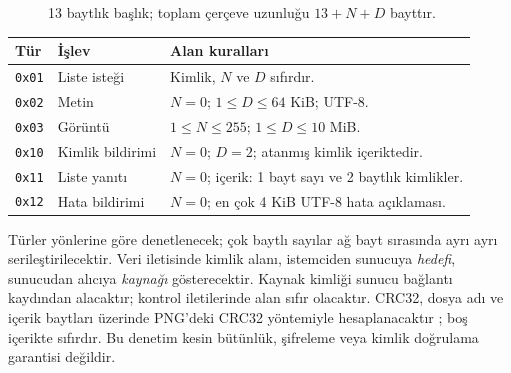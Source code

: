 \documentclass[12pt,oneside,a4paper]{article}
\begin{document}
\begin{figure}[H]
\centering
{}
\caption{13 baytlık başlık; toplam çerçeve uzunluğu $13+N+D$ bayttır.}
\label{fig:frame}
\end{figure}

\begingroup\small
\renewcommand{\arraystretch}{1.03}
\begin{tabularx}{\linewidth}{@{}l>{\raggedright\arraybackslash}p{3.0cm}>{\raggedright\arraybackslash}X@{}}
\toprule
\textbf{Tür} & \textbf{İşlev} & \textbf{Alan kuralları}\\
\midrule
\texttt{0x01} & Liste isteği & Kimlik, $N$ ve $D$ sıfırdır.\\
\texttt{0x02} & Metin & $N=0$; $1\leq D\leq64$ KiB; UTF-8.\\
\texttt{0x03} & Görüntü & $1\leq N\leq255$; $1\leq D\leq10$ MiB.\\
\texttt{0x10} & Kimlik bildirimi & $N=0$; $D=2$; atanmış kimlik içeriktedir.\\
\texttt{0x11} & Liste yanıtı & $N=0$; içerik: 1 bayt sayı ve 2 baytlık kimlikler.\\
\texttt{0x12} & Hata bildirimi & $N=0$; en çok 4 KiB UTF-8 hata açıklaması.\\
\bottomrule
\end{tabularx}
\endgroup

Türler yönlerine göre denetlenecek; çok baytlı sayılar ağ bayt
sırasında ayrı ayrı serileştirilecektir.
Veri iletisinde kimlik alanı, istemciden sunucuya \emph{hedefi},
sunucudan alıcıya \emph{kaynağı} gösterecektir. Kaynak kimliği
sunucu bağlantı kaydından alacaktır; kontrol iletilerinde alan
sıfır olacaktır. CRC32, dosya adı ve içerik baytları üzerinde
PNG'deki CRC32 yöntemiyle hesaplanacaktır \cite{png}; boş içerikte
sıfırdır. Bu denetim kesin bütünlük, şifreleme veya kimlik
doğrulama garantisi değildir.
\end{document}
